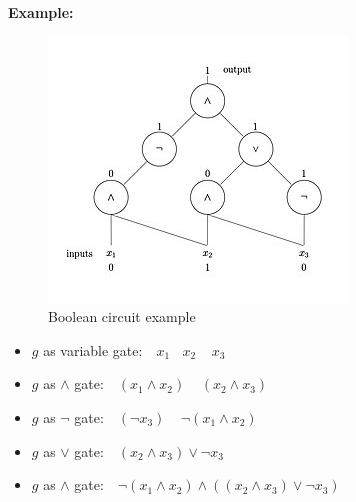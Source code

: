 \documentclass[a4]{scrartcl}
\begin{document}
\textbf{Example:} \\
\begin{minipage}{0.4\textwidth}

\begin{figure}[H]
\begin{center}
\includegraphics[scale=0.6]{booleanC.jpg}
\end{center}
\caption{Boolean circuit example \cite{booleanC}}
\end{figure}

\end{minipage}\begin{minipage}{0.6\textwidth}

\begin{itemize}
\item $g$ as variable gate: $\ \ \ x_1 \ \ \ \  x_2 \ \ \ \ \ x_3$
\item $g$ as $\wedge$ gate: $\ \ \ (x_1 \wedge x_2) \ \ \ \ \ (x_2 \wedge x_3)$
\item $g$ as $\lnot$ gate: $\ \ \ (\lnot x_3) \ \ \ \ \ \lnot (x_1 \wedge x_2)$
\item $g$ as $\vee$ gate: $\ \ \ (x_2 \wedge x_3) \vee \lnot x_3$
\item $g$ as $\wedge$ gate: $\ \ \ \lnot(x_1 \wedge x_2) \wedge ((x_2 \wedge x_3) \vee \lnot x_3)$
\end{itemize}

\end{minipage}




\newpage

\printbibliography
\end{document}
